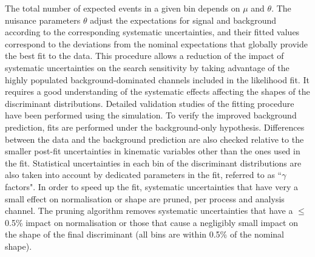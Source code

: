 The total number of expected events in a given bin depends on $\mu$ and
$\theta$. The nuisance parameters $\theta$ adjust the expectations for signal and background
according to the corresponding systematic uncertainties, and their fitted values correspond to the deviations from
the nominal expectations that globally provide the best fit to the data.
This procedure allows a reduction of the impact of systematic uncertainties on 
the search sensitivity by taking advantage of the highly populated background-dominated channels included in the likelihood fit.
It requires a good understanding of the systematic effects affecting the shapes of the discriminant distributions.
Detailed validation studies of the fitting procedure have been performed using the simulation.
To verify the improved background prediction, fits are performed under the background-only hypothesis.
Differences between the data and the background prediction are also checked relative to the smaller post-fit uncertainties
in kinematic variables other than the ones used in the fit.
Statistical uncertainties in each bin of the discriminant distributions are also taken into account by dedicated parameters in the fit, referred to as ``$\gamma$ factors".
In order to speed up the fit, systematic uncertainties that have very a small effect on normalisation or shape are pruned, per process and analysis channel. 
The pruning algorithm removes systematic uncertainties that have a $\leq$0.5\% impact on normalisation or those that cause
a negligibly small impact on the shape of the final discriminant (all bins are within 0.5\% of the nominal shape).

